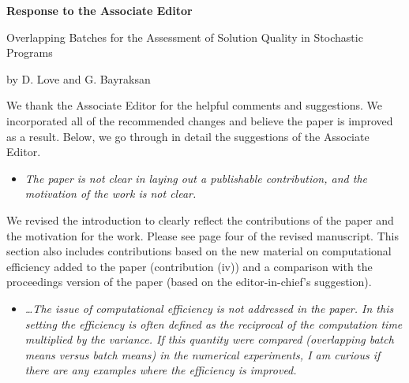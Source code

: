 \documentclass[11pt,notitlepage,onecolumn]{article}
\newcommand{\noi}{\noindent}
\begin{document}

\singlespacing

\baselineskip0.26in


\pagebreak

\begin{center}
\textbf{\Large Response to the Associate Editor} 
\medskip

{\large Overlapping Batches for the Assessment of Solution Quality in Stochastic Programs}
\medskip

{\footnotesize by D. Love and G. Bayraksan}
\end{center}

\bigskip

\bigskip 



\noi
We thank the Associate Editor for the helpful comments and suggestions. 
We incorporated all of the recommended changes and believe the paper is improved as a result. 
Below, we go through in detail the suggestions of the Associate Editor.
\medskip


\begin{itemize}
\item[]\textit{The paper is not clear in laying out a publishable contribution, and the motivation of the work is not clear.}
\end{itemize}

\noi
We revised the introduction to clearly reflect the contributions of the paper and the motivation for the work. 
Please see page four of the revised manuscript. 
This section also includes contributions based on the new material on computational efficiency added to the paper (contribution (iv)) and a comparison with the proceedings version of the paper (based on the editor-in-chief's suggestion).\medskip  

\begin{itemize}
\item[] 
\textit{\ldots The issue of computational efficiency is not addressed  in the paper. 
In this setting the efficiency is often defined as the reciprocal of the computation time multiplied by the variance. 
If this quantity were compared (overlapping batch means versus batch means) in the numerical experiments, I am curious if there are any examples where the efficiency is improved.}
\end{itemize}
\end{document}
